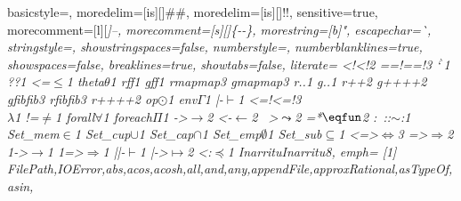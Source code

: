  {
	basicstyle=\ttfamily\codesize,
	moredelim=[is][\showfocus]{\#}{\#},
	moredelim=[is][\showlogic]{!}{!},
	sensitive=true,
	morecomment=[l][\color{gray_ulisses}\ttfamily\itshape\codesize]{--},
	morecomment=[s][\color{gray_ulisses}\ttfamily\itshape\codesize]{\{-}{-\}},
	morestring=[b]",
        escapechar={\`},
	stringstyle=\color{haskellstr},
	showstringspaces=false,
	numberstyle=\codesize,
	numberblanklines=true,
	showspaces=false,
	breaklines=true,
	showtabs=false,
  literate={
	         {<!}{{{\color{lcolor}<!}}}2
           {==!}{{{\color{lcolor}==!}}}3
           {`}{{{$^{\backprime}{}$}}}1
           {?}{{{\color{lcolor}?}}}1
           {<=}{{$\leq$}}1
           {theta}{{$\theta$}}1
           {rf}{{{\color{lappcolor}f}}}1
           {gf}{{{\color{lappascolor}f}}}1
           {rmap}{{{\color{lappcolor}map}}}3
           {gmap}{{{\color{lappascolor}map}}}3
           {r.}{{{\color{lappcolor}.}}}1
           {g.}{{{\color{lappascolor}.}}}1
           {r++}{{{\showfocus{++}}}}2
           {g++}{{{\color{lappascolor}++}}}2
           {gfib}{{{\color{lappascolor}fib}}}3
           {rfib}{{{\color{lappcolor}fib}}}3
           {r++}{{{\color{lappcolor}++}}}2
           {op}{{$\odot$}}1
           {env}{{$\Gamma$}}1
           {|-}{{$\vdash$}}1
           {<=!}{{{\color{lcolor}<=!}}}3
           {\\}{{$\lambda$}}1
           {!=}{{$\neq$}}1
           {forall}{{$\forall$}}1
           {foreach}{{$\Pi$}}1
           {->}{{$\rightarrow$}}2
           {<-}{{$\leftarrow$}}2
           {~>}{{$\leadsto$}}2
           {=*}{{$\eqfun$}}2
           {:~:}{{:$\sim$:}}1
           {Set_mem}{{$\in$}}1
           {Set_cup}{{$\cup$}}1
           {Set_cap}{{$\cap$}}1
           {Set_emp}{{$\emptyset$}}1
           {Set_sub}{{$\subseteq$}}1
           {<=>}{{$\Leftrightarrow$}}3
           {=>}{{$\Rightarrow$}}2
           {1->}{{$\rightarrow$}}1
           {1=>}{{$\Rightarrow$}}1
           {||-}{{$\vdash$}}1
           {|->}{{$\mapsto$}}2
           {<:}{{$\preceq$}}1
           {Inarritu}{Inarritu}8},
	emph=
	{[1]
		FilePath,IOError,abs,acos,acosh,all,and,any,appendFile,approxRational,asTypeOf,asin,
}}
